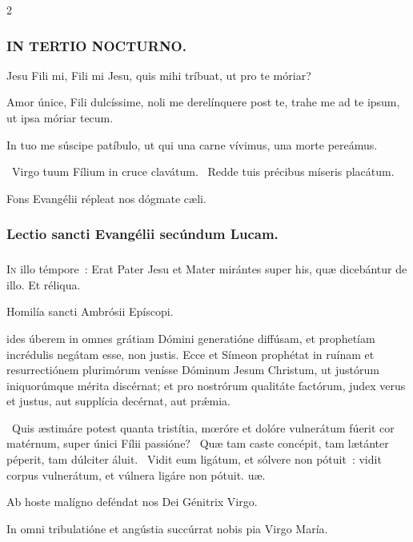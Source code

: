\documentclass[9pt,twoside]{extarticle}
\begin{document}
\begin{multicols}{2}
\subsubsection*{\center \textsc{IN TERTIO NOCTURNO.}}
\begin{tightlist}{}
\item {} Jesu Fili mi, Fili mi Jesu, quis mihi tríbuat, ut pro te móriar?
\item {} Amor únice, Fili dulcíssime, noli me derelínquere post te, trahe me ad te ipsum, ut ipsa móriar tecum.
\item {} In tuo me súscipe patíbulo, ut qui una carne vívimus, una morte pereámus.
\item {}~Virgo tuum Fílium in cruce clavátum. ~Redde tuis précibus míseris placátum. 
\item {\small {} Fons Evangélii répleat nos dógmate cæli.}
\end{tightlist}

\subsubsection*{\center Lectio sancti Evangélii secúndum Lucam.}
\subsubsection*{\center {}}
\lettrine{I}n illo témpore~: Erat Pater Jesu et Mater mirántes super his, quæ dicebántur de illo. Et réliqua.

\begin{center}Homilía sancti Ambrósii Epíscopi.\\
\end{center}
ides úberem in omnes grátiam Dómini generatióne diffúsam, et prophetíam incrédulis negátam esse, non justis. Ecce et Símeon prophétat in ruínam et resurrectiónem plurimórum venísse Dóminum Jesum Christum, ut justórum iniquorúmque mérita discérnat; et pro nostrórum qualitáte factórum, judex verus et justus, aut supplícia decérnat, aut prǽmia.

\begin{tightlist}{}
\item {}~Quis æstimáre potest quanta tristítia, mœróre et dolóre vulnerátum fúerit cor matérnum, super únici Fílii passióne? \textred{*}~Quæ tam caste concépit, tam lætánter péperit, tam dúlciter áluit. ~Vidit eum ligátum, et sólvere non pótuit~: vidit corpus vulnerátum, et vúlnera ligáre non pótuit. uæ.
\item {\small {} Ab hoste malígno deféndat nos Dei Génitrix Virgo.}
\item {}
\item {\small {} In omni tribulatióne et angústia succúrrat nobis pia Virgo María.}
\end{tightlist}


\end{multicols}
\end{document}
